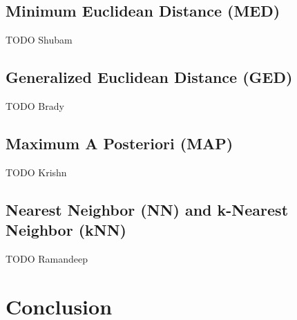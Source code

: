 \documentclass{article}
\begin{document}
\subsection{Minimum Euclidean Distance (MED)}
TODO Shubam

\subsection{Generalized Euclidean Distance (GED)}
TODO Brady

\subsection{Maximum A Posteriori (MAP)}
TODO Krishn

\subsection{Nearest Neighbor (NN) and k-Nearest Neighbor (kNN)}
TODO Ramandeep

\section{Conclusion}
\end{document}
